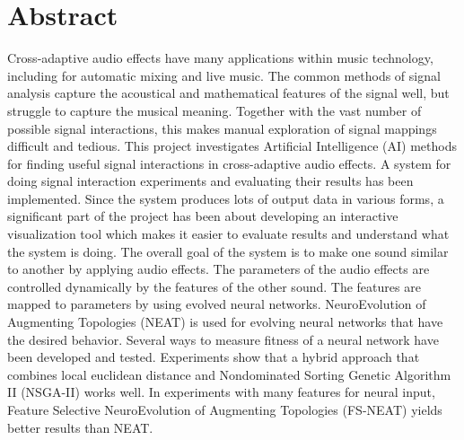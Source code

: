 \section*{Abstract}
Cross-adaptive audio effects have many applications within music technology, including for automatic mixing and live music. The common methods of signal analysis capture the acoustical and mathematical features of the signal well, but struggle to capture the musical meaning. Together with the vast number of possible signal interactions, this makes manual exploration of signal mappings difficult and tedious. This project investigates Artificial Intelligence (AI) methods for finding useful signal interactions in cross-adaptive audio effects. A system for doing signal interaction experiments and evaluating their results has been implemented. Since the system produces lots of output data in various forms, a significant part of the project has been about developing an interactive visualization tool which makes it easier to evaluate results and understand what the system is doing. The overall goal of the system is to make one sound similar to another by applying audio effects. The parameters of the audio effects are controlled dynamically by the features of the other sound. The features are mapped to parameters by using evolved neural networks. NeuroEvolution of Augmenting Topologies (NEAT) is used for evolving neural networks that have the desired behavior. Several ways to measure fitness of a neural network have been developed and tested. Experiments show that a hybrid approach that combines local euclidean distance and Nondominated Sorting Genetic Algorithm II (NSGA-II) works well. In experiments with many features for neural input, Feature Selective NeuroEvolution of Augmenting Topologies (FS-NEAT) yields better results than NEAT.
